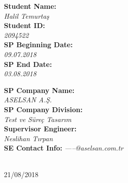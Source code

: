 \begin{titlepage}

\begin{minipage}{0.35\textwidth}
\begin{flushleft} \large
\textbf{Student Name:} \\
 \textit{Halil Temurtaş} \\
\textbf{Student ID:} \\ 
 \textit{2094522} \\
\textbf{SP Beginning Date:} \\
 \textit{09.07.2018} \\
\textbf{SP End Date:}\\
 \textit{03.08.2018}


\end{flushleft}
\end{minipage}
\begin{minipage}{0.6\textwidth}
\begin{flushright} \large
\textbf{SP Company Name:} \\ 
 \textit{ASELSAN A.Ş.} \\
\textbf{SP Company Division:} \\ 
 \textit{Test ve Süreç Tasarım} \\
\textbf{Supervisor Engineer:} \\
 \textit{Neslihan Tırpan} \\
\textbf{SE Contact Info:} 
 \textit{-----@aselsan.com.tr} 
\end{flushright}
\end{minipage}\\[1cm]



{\large 21/08/2018}\\[1cm] %


\vfill %

\end{titlepage}



